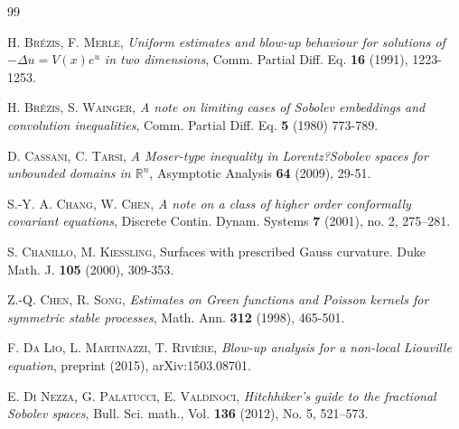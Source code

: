 \documentclass[11pt, a4paper]{article}
\newcommand{\R}{\mathbb{R}}
\begin{document}
\begin{thebibliography}{99}
\begin{small}
 \textsc{H. Br\'ezis, F. Merle,} \emph{Uniform estimates and blow-up behaviour for solutions of $-\Delta u=V(x)e^u$ in two dimensions}, Comm. Partial Diff. Eq. \textbf{16} (1991), 1223-1253.

 \textsc{H. Br\'ezis, S. Wainger}, \emph{A note on limiting cases of Sobolev embeddings and convolution inequalities}, Comm. Partial Diff. Eq. \textbf{5} (1980) 773-789.

 \textsc{D. Cassani, C. Tarsi}, \emph{A Moser-type inequality in Lorentz?Sobolev spaces for unbounded domains in $\R^n$}, Asymptotic Analysis \textbf{64} (2009), 29-51.

 \textsc{S.-Y. A. Chang, W. Chen,} \emph{A note on a class of higher order conformally covariant equations}, Discrete Contin. Dynam. Systems \textbf{7} (2001), no. 2, 275--281.

 \textsc{S. Chanillo, M. Kiessling}, Surfaces with prescribed Gauss curvature. Duke Math. J. \textbf{105} (2000), 309-353.



 \textsc{Z.-Q. Chen, R. Song,} \emph{Estimates on Green functions and Poisson kernels for symmetric stable processes}, Math. Ann.
\textbf{312} (1998), 465-501.


 \textsc{F. Da Lio, L. Martinazzi, T. Rivi\`ere}, \emph{Blow-up analysis for a non-local Liouville equation}, preprint (2015), arXiv:1503.08701.


\textsc{E. Di Nezza, G. Palatucci, E. Valdinoci}, \emph{Hitchhiker's guide to the fractional Sobolev spaces}, Bull. Sci. math., Vol. \textbf{136} (2012), No. 5, 521--573.


\end{small}
\end{thebibliography}
\end{document}
